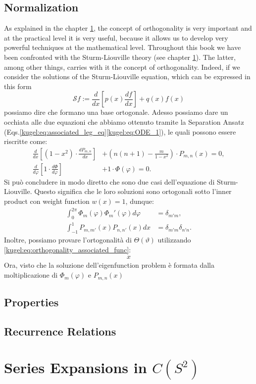 \subsection{Normalization}
As explained in the chapter \ref{}, the concept of orthogonality is very important and at the practical level it is very useful, because it allows us to develop very powerful techniques at the mathematical level.\newline 
Throughout this book we have been confronted with the Sturm-Liouville theory (see chapter \ref{}). The latter, among other things, carries with it the concept of orthogonality. Indeed, if we consider the solutions of the Sturm-Liouville equation, which can be expressed in this form
\begin{equation}\label{kugel:eq:sturm_liouville}
    \mathcal{S}f := \frac{d}{dx}\left[p(x)\frac{df}{dx}\right]+q(x)f(x)
\end{equation}
possiamo dire che formano una base ortogonale.\newline
Adesso possiamo dare un occhiata alle due equazioni che abbiamo ottenuto tramite la Separation Ansatz (Eqs.\eqref{kugel:eq:associated_leg_eq}\eqref{kugel:eq:ODE_1}), le quali possono essere riscritte come:
\begin{align*}
    \frac{d}{dx} \left[ (1-x^2) \cdot \frac{dP_{m,n}}{dx} \right] &+ \left(n(n+1)-\frac{m}{1-x^2} \right) \cdot P_{m,n}(x) = 0, \\
    \frac{d}{d\varphi} \left[ 1 \cdot \frac{ d\Phi }{d\varphi} \right] &+ 1 \cdot \Phi(\varphi) = 0. 
\end{align*}
Si può concludere in modo diretto che sono due casi dell'equazione di Sturm-Liouville. Questo significa che le loro soluzioni sono ortogonali sotto l'inner product con weight function $w(x)=1$, dunque:
\begin{align}
\int_{0}^{2\pi} \Phi_m(\varphi)\Phi_m'(\varphi) d\varphi &= \delta_{m'm}, \nonumber \\
\int_{-1}^1 P_{m,m'}(x)P_{n,n'}(x) dx &= \delta_{m'm}\delta_{n'n}. \label{kugel:eq:orthogonality_associated_func}
\end{align}
Inoltre, possiamo provare l'ortogonalità di $\Theta(\vartheta)$ utilizzando \eqref{kugel:eq:orthogonality_associated_func}:
\begin{align}
    x
\end{align}
Ora, visto che la soluzione dell'eigenfunction problem è formata dalla moltiplicazione di $\Phi_m(\varphi)$ e $P_{m,n}(x)$
\begin{lemma}

\end{lemma}
\subsection{Properties}

\subsection{Recurrence Relations}

\section{Series Expansions in \(C(S^2)\)}

\nocite{olver_introduction_2013}
